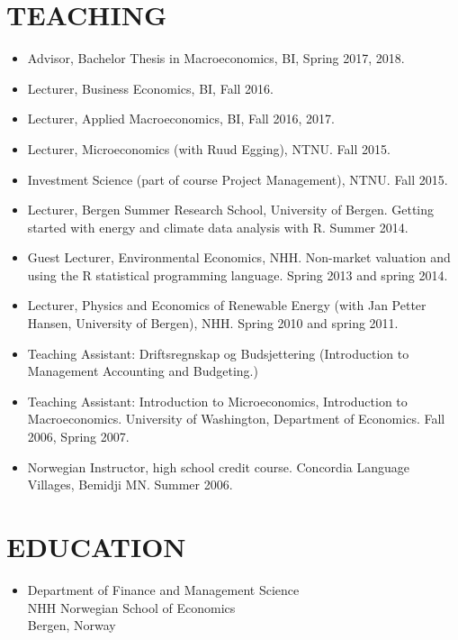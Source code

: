 \documentclass[margin]{res}
\begin{document}
\begin{resume}
\section{TEACHING}
\begin{itemize}
\setlength{\itemsep}{10pt}
\item[] Advisor, Bachelor Thesis in Macroeconomics, BI, Spring 2017, 2018.
\item[] Lecturer, Business Economics, BI, Fall 2016.
\item[] Lecturer, Applied Macroeconomics, BI, Fall 2016, 2017.
\item[] Lecturer, Microeconomics (with Ruud Egging), NTNU.  Fall 2015.
\item[] Investment Science (part of course Project Management), NTNU.  Fall 2015.
\item[] Lecturer, Bergen Summer Research School, University of Bergen.  Getting started with energy and climate data analysis with R.  Summer 2014.
\item[] Guest Lecturer, Environmental Economics, NHH.  Non-market valuation and using the R statistical programming language.  Spring 2013 and spring 2014.
\item[] Lecturer, Physics and Economics of Renewable Energy (with Jan Petter Hansen, University of Bergen), NHH.  Spring 2010 and spring 2011.
\item[] Teaching Assistant: Driftsregnskap og Budsjettering (Introduction to Management Accounting and Budgeting.)
\item[] Teaching Assistant: Introduction to Microeconomics, Introduction to Macroeconomics.  University of Washington, Department of Economics. Fall 2006, Spring 2007.
\item[] Norwegian Instructor, high school credit course.  Concordia Language Villages, Bemidji MN.  Summer 2006.
\end{itemize}

\section{EDUCATION}

\begin{itemize}
\normalsize{\section{Ph.D. Business Economics \\ August 2008 - May 2012}}
\item[] Department of Finance and Management Science\\
NHH Norwegian School of Economics \\
Bergen, Norway \\


\end{itemize}
\end{resume}
\end{document}
